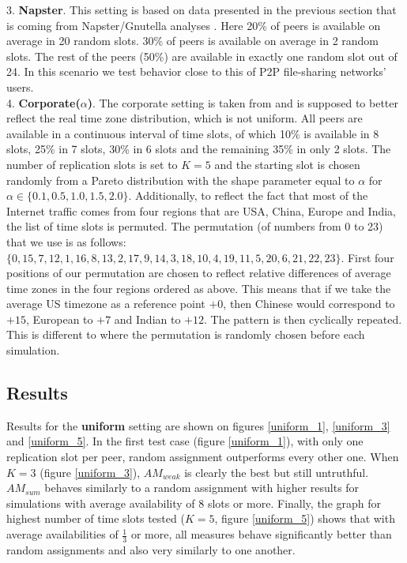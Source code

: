 \documentclass{pracamgren}
\begin{document}
3. {\bf Napster}. This setting is based on data presented in the previous section that is coming from Napster/Gnutella analyses \cite{napster}. Here 20\% of peers is available on average in 20 random slots. 30\% of peers is available on average in 2 random slots. The rest of the peers (50\%) are available in exactly one random slot out of 24. In this scenario we test behavior close to this of P2P file-sharing networks' users.\\

4. {\bf Corporate($\alpha$)}. The corporate setting is taken from \cite{krz} and is supposed to better reflect the real time zone distribution, which is not uniform. All peers are available in a continuous interval of time slots, of which 10\% is available in 8 slots, 25\%  in 7 slots, 30\% in 6 slots and the remaining 35\% in only 2 slots. The number of replication slots is set to $K=5$ and the starting slot is chosen randomly from a Pareto distribution with the shape parameter equal to $\alpha$ for $\alpha \in \{0.1, 0.5, 1.0, 1.5, 2.0\}$. Additionally, to reflect the fact that most of the Internet traffic comes from four regions that are USA, China, Europe and India, the list of time slots is permuted. The permutation (of numbers from 0 to 23) that we use is as follows: $\{ 0, 15, 7, 12, 1, 16, 8, 13, 2, 17, 9, 14, 3, 18, 10, 4, 19, 11, 5, 20, 6, 21, 22, 23\}$. First four positions of our permutation are chosen to reflect relative differences of average time zones in the four regions ordered as above. This means that if we take the average US timezone as a reference point $+0$, then Chinese would correspond to $+15$, European to $+7$ and Indian to $+12$. The pattern is then cyclically repeated. This is different to \cite{krz} where the permutation is randomly chosen before each simulation. \\

\subsection{Results}

Results for the {\bf uniform} setting are shown on figures \ref{uniform_1}, \ref{uniform_3} and \ref{uniform_5}. In the first test case (figure \ref{uniform_1}), with only one replication slot per peer, random assignment outperforms every other one. When $K=3$ (figure \ref{uniform_3}), $AM_{weak}$ is clearly the best but still untruthful. $AM_{sum}$ behaves similarly to a random assignment with higher results for simulations with average availability of 8 slots or more. Finally, the graph for highest number of time slots tested ($K=5$, figure \ref{uniform_5}) shows that with average availabilities of $\frac{1}{3}$ or more, all measures behave significantly better than random assignments and also very similarly to one another.\\
\end{document}
